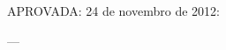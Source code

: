 
%
% 
%
\begin{folhadeaprovacao}

  \begin{center}
    {\large\MakeUppercase{\imprimirautor}}

    \vspace*{\fill}\vspace*{\fill}
    {\bfseries\large\MakeUppercase{\imprimirtitulo}}
    \vspace*{\fill}

    \hspace{.45\textwidth}
    \begin{minipage}{.5\textwidth}
        \imprimirpreambulo
    \end{minipage}%
    \vspace*{\fill}
   \end{center}

   APROVADA: 24 de novembro de 2012:


   \begin{center}
    \vspace*{0.5cm}
    {\large\MakeUppercase{\imprimirlocal}}
    \par
    {\large\imprimirdata}
    \vspace*{1cm}
  \end{center}

\end{folhadeaprovacao}
 ---
